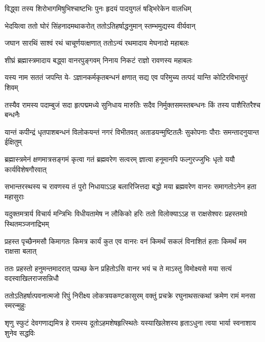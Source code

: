 \twolineshloka
{विद्ध्वा तस्य शिरोभागमिषुभिश्चाष्टभिः पुनः}
{हृदयं पादयुगलं षड्भिरेकेन वालधिम्} %

\twolineshloka
{भेदयित्वा ततो घोरं सिंहनादमथाकरोत्}
{ततोऽतिहर्षाद्धनुमान् स्तम्भमुद्यस्य वीर्यवान्} %

\twolineshloka
{जघान सारथिं साश्वं रथं चाचूर्णयत्क्षणात्}
{ततोऽन्यं रथमादाय मेघनादो महाबलः} %

\twolineshloka
{शीघ्रं ब्रह्मास्त्रमादाय बद्ध्वा वानरपुङ्गवम्}
{निनाय निकटं राज्ञो रावणस्य महाबलः} %

\fourlineindentedshloka
{यस्य नाम सततं जपन्ति ये-}
{ऽज्ञानकर्मकृतबन्धनं क्षणात्}
{सद्य एव परिमुच्य तत्पदं}
{यान्ति कोटिरविभासुरं शिवम्} %

\fourlineindentedshloka
{तस्यैव रामस्य पदाम्बुजं सदा}
{हृत्पद्ममध्ये सुनिधाय मारुतिः}
{सदैव निर्मुक्तसमस्तबन्धनः}
{किं तस्य पाशैरितरैश्च बन्धनैः} %






\fourlineindentedshloka
{यान्तं कपीन्द्रं धृतपाशबन्धनं}
{विलोकयन्तं नगरं विभीतवत्}
{अताडयन्मुष्टितलैः सुकोपनाः}
{पौराः समन्तादनुयान्त ईक्षितुम्} %

\fourlineindentedshloka
{ब्रह्मास्त्रमेनं क्षणमात्रसङ्गमं}
{कृत्वा गतं ब्रह्मवरेण सत्वरम्}
{ज्ञात्वा हनूमानपि फल्गुरज्जुभिः}
{धृतो ययौ कार्यविशेषगौरवात्} %

\fourlineindentedshloka
{सभान्तरस्थस्य च रावणस्य तं}
{पुरो निधायाऽऽह बलारिजित्तदा}
{बद्धो मया ब्रह्मवरेण वानरः}
{समागतोऽनेन हता महासुराः} %

\fourlineindentedshloka
{यदुक्तमत्रार्य विचार्य मन्त्रिभिः}
{विधीयतामेष न लौकिको हरिः}
{ततो विलोक्याऽऽह स राक्षसेश्वरः}
{प्रहस्तमग्रे स्थितमञ्जनाद्रिभम्} %

\fourlineindentedshloka
{प्रहस्त पृच्छैनमसौ किमागतः}
{किमत्र कार्यं कुत एव वानरः}
{वनं किमर्थं सकलं विनाशितं}
{हताः किमर्थं मम राक्षसा बलात्} %

\fourlineindentedshloka
{ततः प्रहस्तो हनुमन्तमादरात्}
{पप्रच्छ केन प्रहितोऽसि वानर}
{भयं च ते माऽस्तु विमोक्ष्यसे मया}
{सत्यं वदस्वाखिलराजसन्निधौ} %

\fourlineindentedshloka
{ततोऽतिहर्षात्पवनात्मजो रिपुं}
{निरीक्ष्य लोकत्रयकण्टकासुरम्}
{वक्तुं प्रचक्रे रघुनाथसत्कथां}
{क्रमेण रामं मनसा स्मरन्मुहुः} %

\fourlineindentedshloka
{शृणु स्फुटं देवगणाद्यमित्र हे}
{रामस्य दूतोऽहमशेषहृत्स्थितेः}
{यस्याखिलेशस्य हृताऽधुना त्वया}
{भार्या स्वनाशाय शुनेव सद्धविः} %

